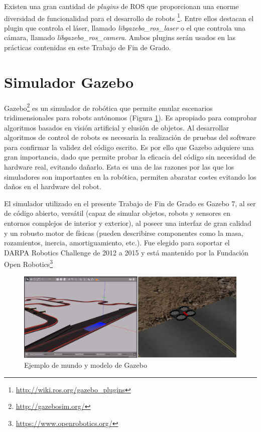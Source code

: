 Existen una gran cantidad de \textit{plugins} de ROS que proporcionan una enorme diversidad de funcionalidad para el desarrollo de robots \footnote{\url{http://wiki.ros.org/gazebo_plugins}}. Entre ellos destacan el plugin que controla el láser, llamado \textit{libgazebo\_ros\_laser} o el que controla una cámara, llamado \textit{libgazebo\_ros\_camera}. Ambos plugins serán usados en las prácticas contenidas en este Trabajo de Fin de Grado.

\section{Simulador Gazebo}
Gazebo\footnote{\url{http://gazebosim.org/}} es un simulador de robótica que permite emular escenarios tridimensionales para robots autónomos (Figura \ref{fig.worlds}). Es apropiado para comprobar algoritmos basados en visión artificial y elusión de objetos. Al desarrollar algoritmos de control de robots es necesaria la realización de pruebas del software para confirmar la validez del código escrito. Es por ello que Gazebo adquiere una gran importancia, dado que permite probar la eficacia del código sin necesidad de hardware real, evitando dañarlo. Esta es una de las razones por las que los simuladores son importantes en la robótica, permiten abaratar costes evitando los daños en el hardware del robot.

El simulador utilizado en el presente Trabajo de Fin de Grado es Gazebo 7, al ser de código abierto, versátil (capaz de simular objetos, robots y sensores en entornos complejos de interior y exterior), al poseer una interfaz de gran calidad y un robusto motor de físicas (pueden describirse componentes como la masa, rozamientos, inercia, amortiguamiento, etc.). Fue elegido para soportar el DARPA Robotics Challenge de 2012 a 2015 y está mantenido por la Fundación Open Robotics\footnote{\url{https://www.openrobotics.org/}}

\begin{figure}[H]
  \begin{center}
    \includegraphics[width=0.9\linewidth]{figures/gazeboworlds.png}
		\caption{Ejemplo de mundo y modelo de Gazebo}
		\label{fig.worlds}
		\end{center}
\end{figure}

